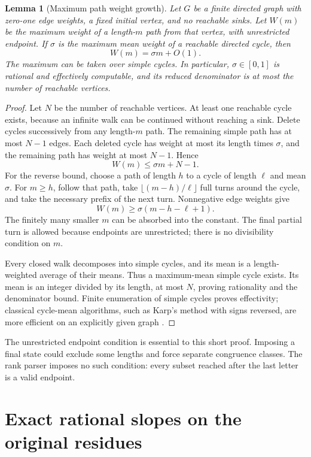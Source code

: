 \documentclass[11pt,letterpaper]{article}
\newtheorem{lemma}[theorem]{Lemma}
\theoremstyle{definition}
\theoremstyle{remark}
\begin{document}
\begin{lemma}[Maximum path weight growth]\label{ccc:rs:lem:cycle}
Let $G$ be a finite directed graph with zero-one edge weights, a fixed initial vertex, and no reachable sinks. Let $W(m)$ be the maximum weight of a length-$m$ path from that vertex, with unrestricted endpoint. If $\sigma$ is the maximum mean weight of a reachable directed cycle, then
\[
W(m)=\sigma m+O(1).
\]
The maximum can be taken over simple cycles. In particular, $\sigma\in[0,1]$ is rational and effectively computable, and its reduced denominator is at most the number of reachable vertices.
\end{lemma}
\begin{proof}
Let $N$ be the number of reachable vertices. At least one reachable cycle exists, because an infinite walk can be continued without reaching a sink. Delete cycles successively from any length-$m$ path. The remaining simple path has at most $N-1$ edges. Each deleted cycle has weight at most its length times $\sigma$, and the remaining path has weight at most $N-1$. Hence
\[
W(m)\le\sigma m+N-1.
\]
For the reverse bound, choose a path of length $h$ to a cycle of length $\ell$ and mean $\sigma$. For $m\ge h$, follow that path, take $\lfloor(m-h)/\ell\rfloor$ full turns around the cycle, and take the necessary prefix of the next turn. Nonnegative edge weights give
\[
W(m)\ge\sigma(m-h-\ell+1).
\]
The finitely many smaller $m$ can be absorbed into the constant. The final partial turn is allowed because endpoints are unrestricted; there is no divisibility condition on $m$.

Every closed walk decomposes into simple cycles, and its mean is a length-weighted average of their means. Thus a maximum-mean simple cycle exists. Its mean is an integer divided by its length, at most $N$, proving rationality and the denominator bound. Finite enumeration of simple cycles proves effectivity; classical cycle-mean algorithms, such as Karp's method with signs reversed, are more efficient on an explicitly given graph \cite{KarpCycle}.
\end{proof}

The unrestricted endpoint condition is essential to this short proof. Imposing a final state could exclude some lengths and force separate congruence classes. The rank parser imposes no such condition: every subset reached after the last letter is a valid endpoint.

\section{Exact rational slopes on the original residues}\label{ccc:rs:sec:theorem}
\end{document}
